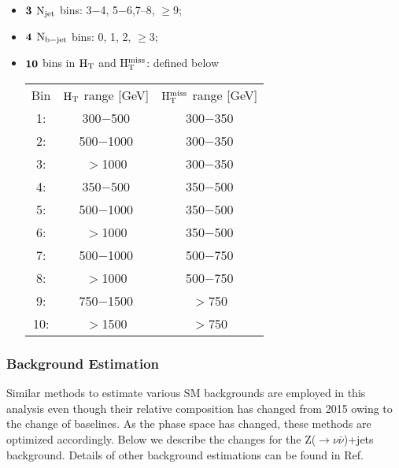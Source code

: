 \begin{itemize}

 \item ${\bf 3 }$ $\rm N_{jet}$ bins: 3$-$4, 5$-$6,7$–$8, $\geq$9;
 \item ${\bf 4 }$ $\rm N_{b-jet}$ bins: 0, 1, 2, $\geq$3;
 \item  ${\bf 10 }$ bins in $\rm H_{T}$ and $\rm H_{T}^{miss}$: defined below



\begin{center}
\begin{tabular}{ c c c }
 Bin & $\rm H_{T}$ range [GeV] & $\rm H_{T}^{miss}$ range [GeV] \\ 
  1: & 300$-$500 & 300$-$350 \\ 

  2: & 500$-$1000 & 300$-$350 \\  

  3: & $>$1000 & 300$-$350\\

  4:&  350$-$500 & 350$-$500\\

  5: & 500$-$1000 & 350$-$500\\

  6: & $>$1000 & 350$-$500\\

  7: & 500$-$1000 & 500$-$750\\

  8: & $>$1000 & 500$-$750\\

  9: & 750$-$1500 & $>$750\\

 10: & $>$1500 & $>$750\\


\end{tabular}
\end{center}


 
\end{itemize}


\subsubsection{Background Estimation}
Similar methods to estimate various SM backgrounds are employed in this analysis even though their relative composition has changed from 2015 owing to the change of baselines. As the phase space has changed, these methods are optimized accordingly. Below we describe the changes for the Z($\rightarrow \nu \bar{\nu}$)+jets background. Details of other background estimations can be found in Ref.~\cite{CMS-PAS-SUS-16-014}


